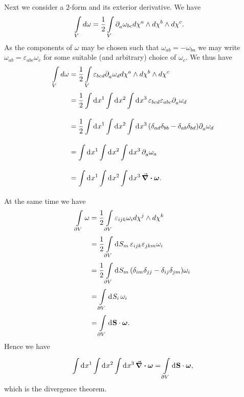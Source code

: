 Next we consider a $2$-form and its exterior derivative. We have
\begin{align*}
	\int\limits_{V}d\omega &= \frac{1}{2}\int\limits_{V}\partial^{}_{a}\omega_{bc}d\chi^{a}\wedge d\chi^{b}\wedge d\chi^{c}.
\end{align*}
As the components of $\omega$ may be chosen such that $\omega_{ab} = -\omega_{ba}$ we may write $\omega_{ab} = \varepsilon_{abc}\omega_{c}$ for some suitable (and arbitrary) choice of $\omega_{c}$. We thus have
\begin{align*}
	\int\limits_{V}d\omega &= \frac{1}{2}\int\limits_{V}\varepsilon_{bcd}\partial^{}_{a}\omega_{d}d\chi^{a}\wedge d\chi^{b}\wedge d\chi^{c} \\
	                        &= \frac{1}{2}\int\limits_{}^{}\dd[]{x^{1}}\int\limits_{}^{}\dd[]{x^{2}}\int\limits_{}^{}\dd[]{x^{3}}\varepsilon_{bcd}\varepsilon_{abc}\partial^{}_{a}\omega_{d} \\
	                        &= \frac{1}{2}\int\limits_{}^{}\dd[]{x^{1}}\int\limits_{}^{}\dd[]{x^{2}}\int\limits_{}^{}\dd[]{x^{3}}(\delta_{ad}\delta_{bb} - \delta_{ab}\delta_{bd})\partial^{}_{a}\omega_{d} \\
	                        &= \int\limits_{}^{}\dd[]{x^{1}}\int\limits_{}^{}\dd[]{x^{2}}\int\limits_{}^{}\dd[]{x^{3}}\partial^{}_{a}\omega_{a} \\
	                        &= \int\limits_{}^{}\dd[]{x^{1}}\int\limits_{}^{}\dd[]{x^{2}}\int\limits_{}^{}\dd[]{x^{3}}\div{\vb*{\omega}}.
\end{align*}
At the same time we have
\begin{align*}
	\int\limits_{\partial V}\omega &= \frac{1}{2}\int\limits_{\partial V}\varepsilon_{ijk}\omega_{i}d\chi^{j}\wedge d\chi^{k} \\
	                           &= \frac{1}{2}\int\limits_{\partial V}^{}\dd[]{S_{m}}\varepsilon_{ijk}\varepsilon_{jkm}\omega_{i} \\
	                           &= \frac{1}{2}\int\limits_{\partial V}^{}\dd[]{S_{m}}(\delta_{im}\delta_{jj} - \delta_{ij}\delta_{jm})\omega_{i} \\
	                           &= \int\limits_{\partial V}^{}\dd[]{S_{i}}\omega_{i} \\
	                           &= \int\limits_{\partial V}^{}\dd[]{\vb{S}}\cdot\vb*{\omega}.
\end{align*}
Hence we have
\begin{align*}
	\int\limits_{}^{}\dd[]{x^{1}}\int\limits_{}^{}\dd[]{x^{2}}\int\limits_{}^{}\dd[]{x^{3}}\div{\vb*{\omega}} = \int\limits_{\partial V}^{}\dd[]{\vb{S}}\cdot\vb*{\omega},
\end{align*}
which is the divergence theorem.


